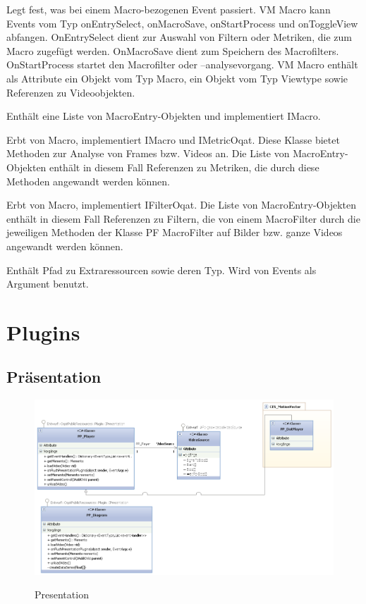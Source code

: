 Legt fest, was bei einem Macro-bezogenen Event passiert. VM Macro kann Events vom Typ onEntrySelect, onMacroSave, onStartProcess und onToggleView abfangen. OnEntrySelect dient zur Auswahl von Filtern oder Metriken, die zum Macro zugefügt werden. OnMacroSave dient zum Speichern des Macrofilters. OnStartProcess startet den Macrofilter oder –analysevorgang. VM Macro enthält als Attribute ein Objekt vom Typ Macro, ein Objekt vom Typ Viewtype sowie Referenzen zu Videoobjekten.


Enthält eine Liste von MacroEntry-Objekten und implementiert IMacro.


Erbt von Macro, implementiert IMacro und IMetricOqat. Diese Klasse bietet Methoden zur Analyse von Frames bzw. Videos an. Die Liste von MacroEntry-Objekten enthält in diesem Fall Referenzen zu Metriken, die durch diese Methoden angewandt werden können.


Erbt von Macro, implementiert IFilterOqat. Die Liste von MacroEntry-Objekten enthält in diesem Fall Referenzen zu Filtern, die von einem MacroFilter durch die jeweiligen Methoden der Klasse PF MacroFilter auf Bilder bzw. ganze Videos angewandt werden können.


Enthält Pfad zu Extraressourcen sowie deren Typ. Wird von Events als Argument benutzt.

\pagebreak
\section{Plugins}
\subsection{Präsentation}
\begin{figure}[h]
\noindent\includegraphics[width=\linewidth,height=\textheight,
keepaspectratio]{bilder/oqatpresentation.png}
\label{}
\caption{Presentation}
\end{figure}

